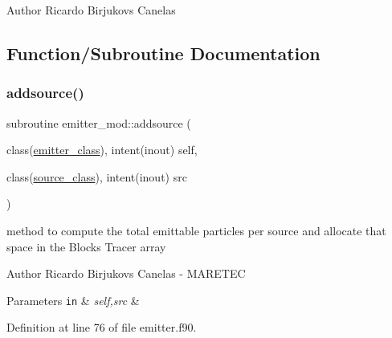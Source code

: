 \begin{DoxyAuthor}{Author}
Ricardo Birjukovs Canelas 
\end{DoxyAuthor}


\subsection{Function/\+Subroutine Documentation}
\mbox{\label{namespaceemitter__mod_ab704fb0e2eb9b3b4b9542706b6fb4eaf}} 
\subsubsection{\texorpdfstring{addsource()}{addsource()}}
{\footnotesize\ttfamily subroutine emitter\+\_\+mod\+::addsource (\begin{DoxyParamCaption}\item[{class(\mbox{\hyperlink{structemitter__mod_1_1emitter__class}{emitter\+\_\+class}}), intent(inout)}]{self,  }\item[{class(\mbox{\hyperlink{structsources__mod_1_1source__class}{source\+\_\+class}}), intent(inout)}]{src }\end{DoxyParamCaption})\hspace{0.3cm}{\ttfamily [private]}}



method to compute the total emittable particles per source and allocate that space in the Blocks Tracer array 

\begin{DoxyAuthor}{Author}
Ricardo Birjukovs Canelas -\/ M\+A\+R\+E\+T\+EC
\end{DoxyAuthor}

\begin{DoxyParams}[1]{Parameters}
\mbox{\tt in}  & {\em self,src} & \\
\hline
\end{DoxyParams}


Definition at line 76 of file emitter.\+f90.


